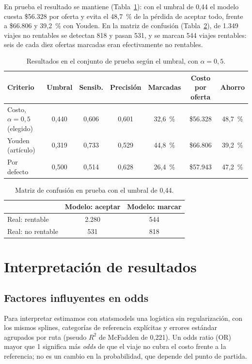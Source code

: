 \documentclass[11pt,letterpaper]{article}
\begin{document}
En prueba el resultado se mantiene (Tabla~\ref{tab:prueba}): con el umbral de 0,44 el modelo cuesta \$56.328 por oferta y evita el 48,7~\% de la pérdida de aceptar todo, frente a \$66.806 y 39,2~\% con Youden. En la matriz de confusión (Tabla~\ref{tab:confusion}), de 1.349 viajes no rentables se detectan 818 y pasan 531, y se marcan 544 viajes rentables: seis de cada diez ofertas marcadas eran efectivamente no rentables.

\begin{table}[H]
\centering
\small
\caption{Resultados en el conjunto de prueba según el umbral, con $\alpha = 0{,}5$.}
\label{tab:prueba}
\begin{tabular}{lcccccc}
\toprule
Criterio & Umbral & Sensib. & Precisión & Marcadas & Costo por oferta & Ahorro \\
\midrule
Costo, $\alpha = 0{,}5$ (elegido) & 0,440 & 0,606 & 0,601 & 32,6~\% & \$56.328 & 48,7~\% \\
Youden (artículo) & 0,319 & 0,733 & 0,529 & 44,8~\% & \$66.806 & 39,2~\% \\
Por defecto & 0,500 & 0,514 & 0,628 & 26,4~\% & \$57.943 & 47,2~\% \\
\bottomrule
\end{tabular}
\end{table}

\begin{table}[H]
\centering
\small
\caption{Matriz de confusión en prueba con el umbral de 0,44.}
\label{tab:confusion}
\begin{tabular}{lcc}
\toprule
 & Modelo: aceptar & Modelo: marcar \\
\midrule
Real: rentable & 2.280 & 544 \\
Real: no rentable & 531 & 818 \\
\bottomrule
\end{tabular}
\end{table}

\section{Interpretación de resultados}
\label{sec:interp}

\subsection{Factores influyentes en odds}

Para interpretar estimamos con statsmodels \cite{statsmodels} una logística sin regularización, con los mismos splines, categorías de referencia explícitas y errores estándar agrupados por ruta (pseudo $R^2$ de McFadden de 0,221). Un odds ratio (OR) mayor que 1 significa más \emph{odds} de que el viaje no cubra el costo frente a la referencia; no es un cambio en la probabilidad, que depende del punto de partida.
\end{document}
